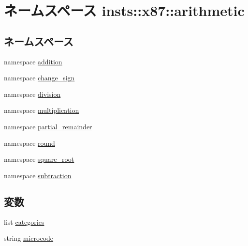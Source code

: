 \hypertarget{namespaceinsts_1_1x87_1_1arithmetic}{
\section{ネームスペース insts::x87::arithmetic}
\label{namespaceinsts_1_1x87_1_1arithmetic}
}
\subsection*{ネームスペース}
\begin{DoxyCompactItemize}
\item 
namespace \hyperlink{namespaceinsts_1_1x87_1_1arithmetic_1_1addition}{addition}
\item 
namespace \hyperlink{namespaceinsts_1_1x87_1_1arithmetic_1_1change__sign}{change\_\-sign}
\item 
namespace \hyperlink{namespaceinsts_1_1x87_1_1arithmetic_1_1division}{division}
\item 
namespace \hyperlink{namespaceinsts_1_1x87_1_1arithmetic_1_1multiplication}{multiplication}
\item 
namespace \hyperlink{namespaceinsts_1_1x87_1_1arithmetic_1_1partial__remainder}{partial\_\-remainder}
\item 
namespace \hyperlink{namespaceinsts_1_1x87_1_1arithmetic_1_1round}{round}
\item 
namespace \hyperlink{namespaceinsts_1_1x87_1_1arithmetic_1_1square__root}{square\_\-root}
\item 
namespace \hyperlink{namespaceinsts_1_1x87_1_1arithmetic_1_1subtraction}{subtraction}
\end{DoxyCompactItemize}
\subsection*{変数}
\begin{DoxyCompactItemize}
\item 
list \hyperlink{namespaceinsts_1_1x87_1_1arithmetic_a273cf0f1630af14c1582f05e53354a55}{categories}
\item 
string \hyperlink{namespaceinsts_1_1x87_1_1arithmetic_a770f11a173e99389a8802f0107ed8f52}{microcode}
\end{DoxyCompactItemize}


